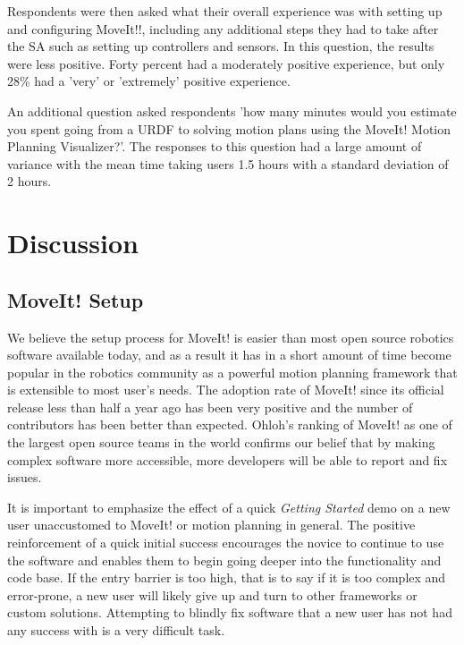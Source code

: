 \documentclass[10pt,journal,compsoc]{joser1}
\begin{document}
{Respondents were then asked what their overall experience was with setting up and configuring MoveIt!!, including any additional steps they had to take after the SA such as setting up controllers and sensors. In this question, the results were less positive. Forty percent had a moderately positive experience, but only 28\% had a 'very' or 'extremely' positive experience. 

An additional question asked respondents 'how many minutes would you estimate you spent going from a URDF to solving motion plans using the MoveIt! Motion Planning Visualizer?'. The responses to this question had a large amount of variance with the mean time taking users 1.5 hours with a standard deviation of 2 hours.



\section{Discussion}
\label{sec::discussion}

\subsection{MoveIt! Setup}
\label{sec::moveit_discussion}

We believe the setup process for MoveIt! is easier than most open source robotics software available today, and as a result it has in a short amount of time become popular in the robotics community as a powerful motion planning framework that is extensible to most user's needs. The adoption rate of MoveIt! since its official release less than half a year ago has been very positive and the number of contributors has been better than expected. Ohloh's ranking of MoveIt! as one of the largest open source teams in the world confirms our belief that by making complex software more accessible, more developers will be able to report and fix issues. 

It is important to emphasize the effect of a quick \textit{Getting Started} demo on a new user unaccustomed to MoveIt! or motion planning in general. The positive reinforcement of a quick initial success encourages the novice to continue to use the software and enables them to begin going deeper into the functionality and code base. If the entry barrier is too high, that is to say if it is too complex and error-prone, a new user will likely give up and turn to other frameworks or custom solutions. Attempting to blindly fix software that a new user has not had any success with is a very difficult task.

}
\end{document}

